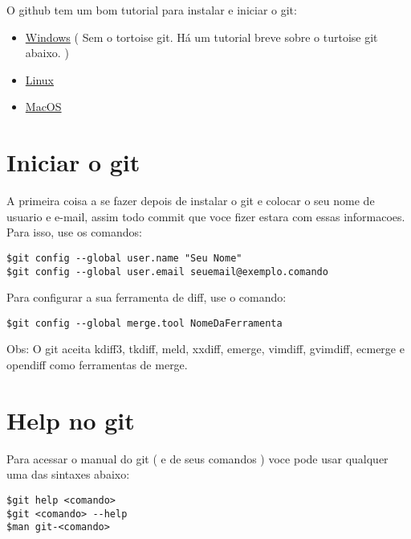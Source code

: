 \documentclass{article}
\begin{document}
	O github tem um bom tutorial para instalar e iniciar o git:
	\begin{itemize}
    \item \href{http://help.github.com/win-set-up-git/}{Windows} ( Sem o tortoise git. Há um
                    tutorial breve sobre o turtoise git abaixo. ) 
    \item \href{http://help.github.com/linux-set-up-git/}{Linux}
    \item \href{http://help.github.com/mac-set-up-git/}{MacOS} 
    \end{itemize}
    
\section{Iniciar o git}
    A primeira coisa a se fazer depois de instalar o git e colocar o seu nome de
usuario e e-mail, assim todo commit que voce fizer estara com essas informacoes.
Para isso, use os comandos:

\begin{tabbing}
\hspace{1cm}\=   \verb#$git config --global user.name "Seu Nome"# \\
            \>   \verb#$git config --global user.email seuemail@exemplo.comando#
\end{tabbing}
    Para configurar a sua ferramenta de diff, use o comando:

\begin{tabbing}
\hspace{1cm}\=   \verb#$git config --global merge.tool NomeDaFerramenta#
\end{tabbing}

Obs: O git aceita kdiff3, tkdiff, meld, xxdiff, emerge, vimdiff, gvimdiff, ecmerge
e opendiff como ferramentas de merge.

\section{Help no git}
    Para acessar o manual do git ( e de seus comandos ) voce pode usar qualquer
uma das sintaxes abaixo:

\begin{tabbing}
\hspace{1cm}\=  \verb#$git help <comando>#\\
            \>  \verb#$git <comando> --help#\\
            \>  \verb#$man git-<comando>#
\end{tabbing}
\end{document}
